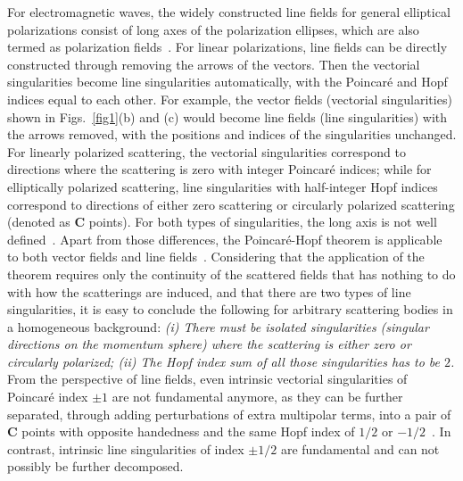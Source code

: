 \documentclass[aps,twocolumn,superscriptaddress]{revtex4-1}
\newcounter{Fig}
\begin{document}
For electromagnetic waves, the widely constructed line fields for general elliptical polarizations consist of long axes of the polarization ellipses, which are also termed as polarization fields~\cite{NYE_natural_1999,GBUR_2016__Singular}.  For linear polarizations, line fields can be directly constructed through removing the arrows of the vectors. Then the vectorial singularities become line singularities automatically, with the Poincar\'{e} and Hopf indices equal to each other.  For example, the vector fields (vectorial singularities) shown in Figs.~\ref{fig1}(b) and (c) would become line fields (line singularities) with the arrows removed, with the positions and indices of the singularities unchanged. For linearly polarized scattering, the vectorial singularities correspond to directions where the scattering is zero with integer Poincar\'{e} indices; while for elliptically polarized scattering, line singularities with half-integer Hopf indices correspond to directions of either zero scattering or circularly polarized scattering (denoted as \textbf{C} points). For both types of singularities, the long axis is not well defined~\cite{NYE_natural_1999,GBUR_2016__Singular}. Apart from those differences, the Poincar\'{e}-Hopf theorem is applicable to both vector fields and line fields~\cite{MILNOR_1997__Topology,NEEDHAM_1998__Visual,HOPF_2003__Differential}. Considering that the application of the theorem requires only the continuity of the scattered fields that has nothing to do with how the scatterings are induced, and that there are two types of line singularities, it is easy to conclude the following for arbitrary scattering bodies in a homogeneous background: \textit{(i) There must be isolated  singularities (singular directions on the momentum sphere) where the scattering is either zero or circularly polarized; (ii) The Hopf index sum of all those singularities has to be $2$.} From the perspective of line fields, even intrinsic vectorial singularities of Poincar\'{e} index $\pm1$ are not fundamental anymore, as they can be further separated, through adding perturbations of extra multipolar terms,  into a pair of $\textbf{C}$ points with opposite handedness and the same Hopf index of $1/2$ or $-1/2$~\cite{jackson1962classical,NYE_natural_1999,GBUR_2016__Singular}. In contrast, intrinsic line singularities of index $\pm 1/2$ are fundamental and can not possibly be further decomposed.
\end{document}

